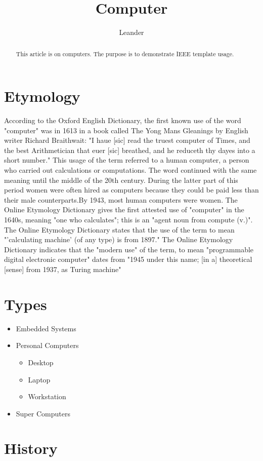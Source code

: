 \documentclass[a4paper,11pt]{article}
\title{Computer}
\author{Leander}
\begin{document}
\maketitle
\tableofcontents

\begin{abstract}
This article is on computers.
The purpose is to demonstrate IEEE template usage.
\end{abstract}

\section{Etymology}
According to the Oxford English Dictionary, the first known use of the word "computer" was in 1613 in a book called The Yong Mans Gleanings by English writer Richard Braithwait: "I haue [sic] read the truest computer of Times, and the best Arithmetician that euer [sic] breathed, and he reduceth thy dayes into a short number." This usage of the term referred to a human computer, a person who carried out calculations or computations. The word continued with the same meaning until the middle of the 20th century. During the latter part of this period women were often hired as computers because they could be paid less than their male counterparts.By 1943, most human computers were women.
The Online Etymology Dictionary gives the first attested use of "computer" in the 1640s, meaning "one who calculates"; this is an "agent noun from compute (v.)". The Online Etymology Dictionary states that the use of the term to mean "'calculating machine' (of any type) is from 1897." The Online Etymology Dictionary indicates that the "modern use" of the term, to mean "programmable digital electronic computer" dates from "1945 under this name; [in a] theoretical [sense] from 1937, as Turing machine"
\section{Types}
\begin{itemize}
\item Embedded Systems
\item Personal Computers
\begin{itemize}
\item Desktop
\item Laptop
\item Workstation
\end{itemize} 
\item Super Computers
\end{itemize}
\section{History}
\end{document}
